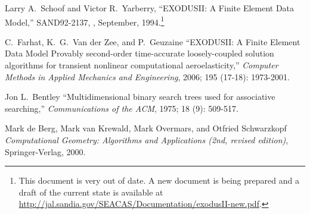 \begin{thebibliography}{9}

Larry A.~Schoof and Victor R.~Yarberry, 
``EXODUSII: A Finite Element Data Model,'' 
SAND92-2137, 
\SNLA, 
September, 1994.\footnote{This document is very out of date.  A new
document is being prepared and a draft of the current state is
available at \url{http://jal.sandia.gov/SEACAS/Documentation/exodusII-new.pdf}.}

C.~Farhat, K.~G.~Van der Zee, and P.~Geuzaine
``EXODUSII: A Finite Element Data Model Provably second-order time-accurate loosely-coupled solution algorithms for transient nonlinear computational aeroelasticity,'' 
{\em Computer Methods in Applied Mechanics and Engineering}, 
2006; 195 (17-18): 1973-2001.

Jon L.~Bentley
``Multidimensional binary search trees used for associative searching,''
{\em Communications of the ACM},
1975; 18 (9): 509-517.

Mark de Berg, Mark van Krewald, Mark Overmars, and Otfried Schwarzkopf
{\em Computational Geometry: Algorithms and Applications (2nd, revised edition)},
Springer-Verlag,
2000.

\end{thebibliography}
